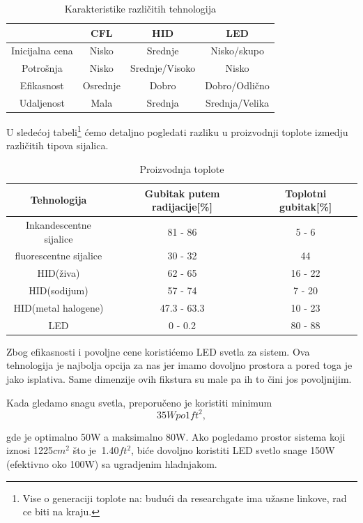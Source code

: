 \documentclass[a4paper,11pt]{book}
\begin{document}
\begin{table}[ht]
  \caption{Karakteristike različitih tehnologija}
  \centering
  \begin{tabular}{|c|c|c|c|}
  \hline
   & CFL & HID & LED \\ \hline
  Inicijalna cena & Nisko & Srednje & Nisko/skupo \\ \hline
  Potrošnja & Nisko & Srednje/Visoko & Nisko \\ \hline
  Efikasnost & Osrednje & Dobro & Dobro/Odlično \\ \hline
  Udaljenost & Mala & Srednja & Srednja/Velika \\ \hline
  \end{tabular}
\end{table}

U sledećoj tabeli\footnote{Vise o generaciji toplote na: budući da researchgate ima užasne linkove, rad ce biti na kraju.} ćemo detaljno pogledati razliku u proizvodnji toplote izmedju različitih tipova sijalica.


\begin{table}[ht]
  \caption{Proizvodnja toplote}
  \centering
  \begin{tabular}{|c|c|c|}
  \hline
    Tehnologija & Gubitak putem radijacije[\%] & Toplotni gubitak[\%] \\ \hline
  Inkandescentne sijalice & 81 - 86 & 5 - 6 \\ \hline
  fluorescentne sijalice & 30 - 32 & 44 \\ \hline
  HID(živa) & 62 - 65 & 16 - 22 \\ \hline
  HID(sodijum) & 57 - 74 & 7 - 20 \\ \hline
  HID(metal halogene) & 47.3 - 63.3 & 10 - 23 \\ \hline
  LED & 0 - 0.2 & 80 - 88 \\ \hline
  \end{tabular}
\end{table}

Zbog efikasnosti i povoljne cene koristićemo LED svetla za sistem. Ova tehnologija je najbolja opcija za nas jer imamo dovoljno prostora a pored toga je jako isplativa. Same dimenzije ovih fikstura su male pa ih to čini jos povoljnijim.


Kada gledamo snagu svetla, preporučeno je koristiti minimum 
\[35W po 1ft^2,\]

gde je optimalno 50W a maksimalno 80W. Ako pogledamo prostor sistema koji iznosi 1225$cm^2$ što je $~$1.40$ft^2$, biće dovoljno koristiti LED svetlo snage 150W (efektivno oko 100W) sa ugradjenim hladnjakom.
\end{document}
